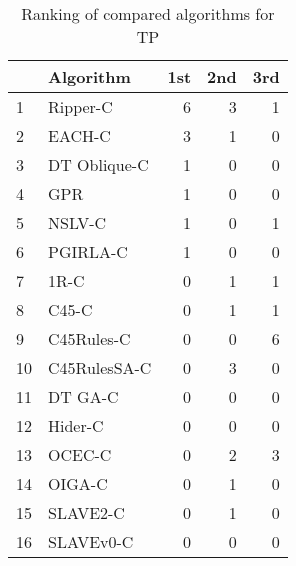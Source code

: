 \begin{table}
\footnotesize
\caption{Ranking of compared algorithms for TP}
\label{tab:places TP}
\begin{tabular}{llrrr}
\hline
 & Algorithm & 1st & 2nd & 3rd \\
\hline
1 & Ripper-C & 6 & 3 & 1 \\
2 & EACH-C & 3 & 1 & 0 \\
3 & DT Oblique-C & 1 & 0 & 0 \\
4 & GPR & 1 & 0 & 0 \\
5 & NSLV-C & 1 & 0 & 1 \\
6 & PGIRLA-C & 1 & 0 & 0 \\
7 & 1R-C & 0 & 1 & 1 \\
8 & C45-C & 0 & 1 & 1 \\
9 & C45Rules-C & 0 & 0 & 6 \\
10 & C45RulesSA-C & 0 & 3 & 0 \\
11 & DT GA-C & 0 & 0 & 0 \\
12 & Hider-C & 0 & 0 & 0 \\
13 & OCEC-C & 0 & 2 & 3 \\
14 & OIGA-C & 0 & 1 & 0 \\
15 & SLAVE2-C & 0 & 1 & 0 \\
16 & SLAVEv0-C & 0 & 0 & 0 \\
\hline
\end{tabular}
\end{table}
